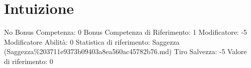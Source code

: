 \section{Intuizione}\label{intuizione}

\begin{description}
\tightlist
\item[Tags: ABI]
No Bonus Competenza: 0 Bonus Competenza di Riferimento: 1 Modificatore:
-5 Modificatore Abilità: 0 Statistica di riferimento: Saggezza
(Saggezza\%203711e9373b09403a8ea560ac45782b76.md) Tiro Salvezza: -5
Valore di riferimento: 0
\end{description}
